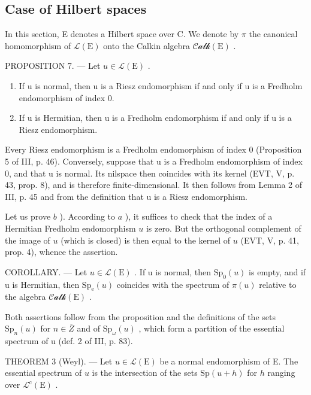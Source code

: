 \subsection{Case of Hilbert spaces}

In this section, E denotes a Hilbert space over C. We denote by \(\pi\) the canonical homomorphism of \(\mathcal{L}(\mathrm{E})\) onto the Calkin algebra \(\mathcal{Calk}(\mathrm{E})\) .

PROPOSITION 7. --- Let \(u \in \mathcal{L}(\mathrm{E})\) .

\begin{enumerate}
\def\labelenumi{\alph{enumi})}
\item
  If u is normal, then u is a Riesz endomorphism if and only if u is a Fredholm endomorphism of index 0.
\item
  If u is Hermitian, then u is a Fredholm endomorphism if and only if u is a Riesz endomorphism.
\end{enumerate}

Every Riesz endomorphism is a Fredholm endomorphism of index 0 (Proposition 5 of III, p. 46). Conversely, suppose that u is a Fredholm endomorphism of index 0, and that u is normal. Its nilspace then coincides with its kernel (EVT, V, p. 43, prop. 8), and is therefore finite-dimensional. It then follows from Lemma 2 of III, p. 45 and from the definition that u is a Riesz endomorphism.

Let us prove \(b\) ). According to \(a\) ), it suffices to check that the index of a Hermitian Fredholm endomorphism \(u\) is zero. But the orthogonal complement of the image of \(u\) (which is closed) is then equal to the kernel of \(u\) (EVT, V, p. 41, prop. 4), whence the assertion.

COROLLARY. --- Let \(u \in \mathcal{L}(\mathrm{E})\) . If u is normal, then \(\mathrm{Sp}_{0}(u)\) is empty, and if u is Hermitian, then \(\mathrm{Sp}_{\mathrm{e}}(u)\) coincides with the spectrum of \(\pi(u)\) relative to the algebra \(\mathcal{Calk}(\mathrm{E})\) .

Both assertions follow from the proposition and the definitions of the sets \(\mathrm{Sp}_{n}(u)\) for \(n \in \overline{Z}\) and of \(\mathrm{Sp}_{\omega}(u)\) , which form a partition of the essential spectrum of u (def. 2 of III, p. 83).

THEOREM 3 (Weyl). --- Let \(u \in \mathcal{L}(\mathrm{E})\) be a normal endomorphism of E. The essential spectrum of \(u\) is the intersection of the sets \(\mathrm{Sp}(u + h)\) for \(h\) ranging over \(\mathcal{L}^{\mathrm{c}}(\mathrm{E})\) .


